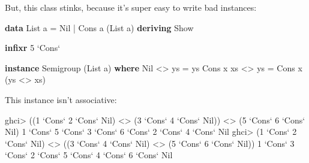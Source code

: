 \documentclass[]{article}
\newenvironment{Shaded}{}{}
\newcommand{\KeywordTok}[1]{\textcolor[rgb]{0.00,0.44,0.13}{\textbf{{#1}}}}
\newcommand{\DataTypeTok}[1]{\textcolor[rgb]{0.56,0.13,0.00}{{#1}}}
\newcommand{\DecValTok}[1]{\textcolor[rgb]{0.25,0.63,0.44}{{#1}}}
\newcommand{\OtherTok}[1]{\textcolor[rgb]{0.00,0.44,0.13}{{#1}}}
\newcommand{\FunctionTok}[1]{\textcolor[rgb]{0.02,0.16,0.49}{{#1}}}
\newcommand{\NormalTok}[1]{{#1}}
\begin{document}
But, this class stinks, because it's super easy to write bad instances:

\begin{Shaded}
\begin{Highlighting}[]
\KeywordTok{data} \DataTypeTok{List} \NormalTok{a }\FunctionTok{=} \DataTypeTok{Nil} \FunctionTok{|} \DataTypeTok{Cons} \NormalTok{a (}\DataTypeTok{List} \NormalTok{a)}
    \KeywordTok{deriving} \DataTypeTok{Show}

\KeywordTok{infixr} \DecValTok{5} \OtherTok{`Cons`}

\KeywordTok{instance} \DataTypeTok{Semigroup} \NormalTok{(}\DataTypeTok{List} \NormalTok{a) }\KeywordTok{where}
    \DataTypeTok{Nil}       \FunctionTok{<>} \NormalTok{ys }\FunctionTok{=} \NormalTok{ys}
    \DataTypeTok{Cons} \NormalTok{x xs }\FunctionTok{<>} \NormalTok{ys }\FunctionTok{=} \DataTypeTok{Cons} \NormalTok{x (ys }\FunctionTok{<>} \NormalTok{xs)}
\end{Highlighting}
\end{Shaded}

This instance isn't associative:

\begin{Shaded}
\begin{Highlighting}[]
\NormalTok{ghci}\FunctionTok{>} \NormalTok{((}\DecValTok{1} \OtherTok{`Cons`} \DecValTok{2} \OtherTok{`Cons`} \DataTypeTok{Nil}\NormalTok{) }\FunctionTok{<>} \NormalTok{(}\DecValTok{3} \OtherTok{`Cons`} \DecValTok{4} \OtherTok{`Cons`} \DataTypeTok{Nil}\NormalTok{)) }\FunctionTok{<>} \NormalTok{(}\DecValTok{5} \OtherTok{`Cons`} \DecValTok{6} \OtherTok{`Cons`} \DataTypeTok{Nil}\NormalTok{)}
\DecValTok{1} \OtherTok{`Cons`} \DecValTok{5} \OtherTok{`Cons`} \DecValTok{3} \OtherTok{`Cons`} \DecValTok{6} \OtherTok{`Cons`} \DecValTok{2} \OtherTok{`Cons`} \DecValTok{4} \OtherTok{`Cons`} \DataTypeTok{Nil}
\NormalTok{ghci}\FunctionTok{>} \NormalTok{(}\DecValTok{1} \OtherTok{`Cons`} \DecValTok{2} \OtherTok{`Cons`} \DataTypeTok{Nil}\NormalTok{) }\FunctionTok{<>} \NormalTok{((}\DecValTok{3} \OtherTok{`Cons`} \DecValTok{4} \OtherTok{`Cons`} \DataTypeTok{Nil}\NormalTok{) }\FunctionTok{<>} \NormalTok{(}\DecValTok{5} \OtherTok{`Cons`} \DecValTok{6} \OtherTok{`Cons`} \DataTypeTok{Nil}\NormalTok{))}
\DecValTok{1} \OtherTok{`Cons`} \DecValTok{3} \OtherTok{`Cons`} \DecValTok{2} \OtherTok{`Cons`} \DecValTok{5} \OtherTok{`Cons`} \DecValTok{4} \OtherTok{`Cons`} \DecValTok{6} \OtherTok{`Cons`} \DataTypeTok{Nil}
\end{Highlighting}
\end{Shaded}
\end{document}
